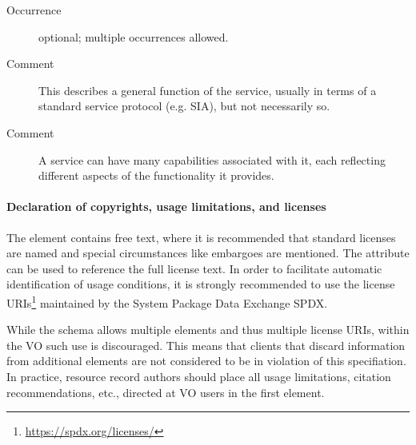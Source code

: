 \documentclass[11pt,a4paper]{ivoa}
\begin{document}
\begin{generated}
\begin{bigdescription}
\begin{description}
\item[Occurrence] optional; multiple occurrences allowed.
\item[Comment]
                        This describes a general function of the
                        service, usually in terms of a standard
                        service protocol (e.g. SIA), but not
                        necessarily so.

\item[Comment]
                        A service can have many capabilities
                        associated with it, each reflecting different
                        aspects of the functionality it provides.


\end{description}


\end{bigdescription}\endgroup

\endgroup
\end{generated}


\paragraph{Declaration of copyrights, usage limitations, and licenses}

The  element contains free text, where it is recommended
that standard licenses are named and special circumstances like embargoes
are mentioned.  The  attribute can be used to
reference the
full license text.  In order to facilitate automatic identification
of usage conditions, it is strongly recommended to use the license
URIs\footnote{\url{https://spdx.org/licenses/}} maintained by the System
Package Data Exchange SPDX.

While the schema allows multiple  elements and thus
multiple license URIs, within the VO such use is discouraged.  This
means that clients that discard information from additional
 elements are not considered to be in violation of this
specifiation.  In practice, resource record authors should place all
usage limitations, citation recommendations, etc., directed at VO users
in the first  element.
\end{document}
